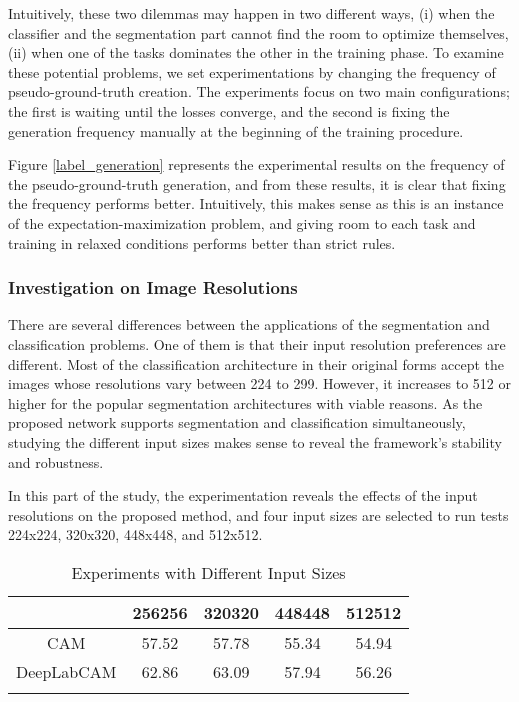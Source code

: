 \documentclass[sn-mathphys]{sn-jnl}
\theoremstyle{thmstyleone}
\theoremstyle{thmstyletwo}\newtheorem{example}{Example}\newtheorem{remark}{Remark}
\theoremstyle{thmstylethree}\newtheorem{definition}{Definition}
\begin{document}
Intuitively, these two dilemmas may happen in two different ways, (i) when the classifier and the segmentation part cannot find the room to optimize themselves,  (ii) when one of the tasks dominates the other in the training phase. To examine these potential problems, we set experimentations by changing the frequency of pseudo-ground-truth creation. The experiments focus on two main configurations; the first is waiting until the losses converge, and the second is fixing the generation frequency manually at the beginning of the training procedure.

Figure \ref{label_generation} represents the experimental results on the frequency of the pseudo-ground-truth generation, and from these results, it is clear that fixing the frequency performs better. Intuitively, this makes sense as this is an instance of the expectation-maximization problem, and giving room to each task and training in relaxed conditions performs better than strict rules.


\subsubsection{Investigation on Image Resolutions}

There are several differences between the applications of the segmentation and classification problems. One of them is that their input resolution preferences are different. Most of the classification architecture in their original forms accept the images whose resolutions vary between 224 to 299. However, it increases to 512 or higher for the popular segmentation architectures with viable reasons. As the proposed network supports segmentation and classification simultaneously, studying the different input sizes makes sense to reveal the framework's stability and robustness.

In this part of the study, the experimentation reveals the effects of the input resolutions on the proposed method, and four input sizes are selected to run tests 224x224, 320x320, 448x448, and 512x512.

\begin{table}[!ht]
    \begin{center}
    \begin{minipage}{\textwidth}
    \caption{Experiments with Different Input Sizes}\label{resolutions}\begin{tabular*}{\textwidth}{@{\extracolsep{\fill}}ccccc@{\extracolsep{\fill}}}
    \toprule & 256256 & 320320 & 448448 & 512512 \\
    \midrule
    CAM & 57.52 & 57.78 & 55.34 & 54.94 \\
    DeepLabCAM & 62.86 & 63.09 & 57.94 & 56.26 \\
    
    \botrule
    \end{tabular*}
    \end{minipage}
    \end{center}
\end{table}
\end{document}
